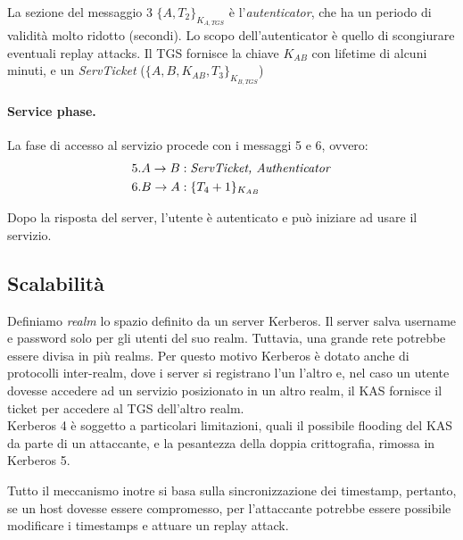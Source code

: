 \documentclass[a4paper, 11pt, twoside]{article}
\begin{document}
	La sezione del messaggio 3 $\lbrace A, T_2\rbrace_{K_{A, TGS}}$ è l'\textit{autenticator}, che ha un periodo di validità molto ridotto (secondi). Lo scopo dell'autenticator è quello di scongiurare eventuali replay attacks. Il TGS fornisce la chiave $K_{AB}$ con lifetime di alcuni minuti, e un \textit{ServTicket} ($\lbrace A, B, K_{AB}, T_3\rbrace_{K_{B, TGS}}$)

	\paragraph{Service phase.} La fase di accesso al servizio procede con i messaggi 5 e 6, ovvero: \begin{align*}
		5. A \to B&: \text{\textit{ServTicket, Authenticator}}\\
		6. B \to A&: \lbrace T_4 + 1\rbrace_{K_{AB}}
	\end{align*}

	Dopo la risposta del server, l'utente è autenticato e può iniziare ad usare il servizio.

	\subsection{Scalabilità}
	Definiamo \textit{realm} lo spazio definito da un server Kerberos. Il server salva username e password solo per gli utenti del suo realm. Tuttavia, una grande rete potrebbe essere divisa in più realms. Per questo motivo Kerberos è dotato anche di protocolli inter-realm, dove i server si registrano l'un l'altro e, nel caso un utente dovesse accedere ad un servizio posizionato in un altro realm, il KAS fornisce il ticket per accedere al TGS dell'altro realm. \\

	Kerberos 4 è soggetto a particolari limitazioni, quali il possibile flooding del KAS da parte di un attaccante, e la pesantezza della doppia crittografia, rimossa in Kerberos 5.

	Tutto il meccanismo inotre si basa sulla sincronizzazione dei timestamp, pertanto, se un host dovesse essere compromesso, per l'attaccante potrebbe essere possibile modificare i timestamps e attuare un replay attack.
\end{document}
